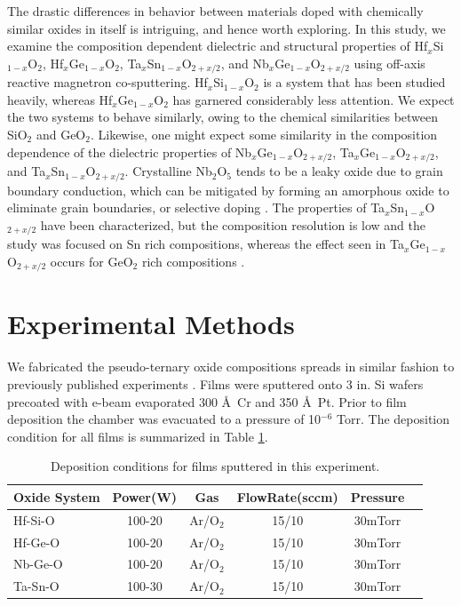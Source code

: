 The drastic differences in behavior between materials doped with chemically similar oxides in itself is intriguing, and hence worth exploring. In this study, we examine the composition dependent dielectric and structural properties of Hf$_{x}$Si$_{1-x}$O$_{2}$, Hf$_{x}$Ge$_{1-x}$O$_{2}$, Ta$_{x}$Sn$_{1-x}$O$_{2+x/2}$, and Nb$_{x}$Ge$_{1-x}$O$_{2+x/2}$ using off-axis reactive magnetron co-sputtering. Hf$_{x}$Si$_{1-x}$O$_{2}$ is a system that has been studied heavily, whereas Hf$_{x}$Ge$_{1-x}$O$_{2}$ has garnered considerably less attention. We expect the two systems to behave similarly, owing to the chemical similarities between SiO$_{2}$ and GeO$_{2}$. Likewise, one might expect some similarity in the composition dependence of the dielectric properties of Nb$_{x}$Ge$_{1-x}$O$_{2+x/2}$, Ta$_{x}$Ge$_{1-x}$O$_{2+x/2}$, and  Ta$_{x}$Sn$_{1-x}$O$_{2+x/2}$. Crystalline Nb$_{2}$O$_{5}$ tends to be a leaky oxide due to grain boundary conduction, which can be mitigated by forming an amorphous oxide to eliminate grain boundaries, or selective doping \cite{Pignolet1995,Kukli1999}. The properties of  Ta$_{x}$Sn$_{1-x}$O$_{2+x/2}$ have been characterized, but the composition resolution is low and the study was focused on Sn rich compositions, whereas the effect seen in Ta$_{x}$Ge$_{1-x}$O$_{2+x/2}$ occurs for GeO$_{2}$ rich compositions \cite{Fujikawa1997}.

\section{Experimental Methods}

We fabricated the pseudo-ternary oxide compositions spreads in similar fashion to previously published experiments \cite{VanDover1998}. Films were sputtered onto 3 in. Si wafers precoated with e-beam evaporated 300 \AA\ Cr and 350 \AA\ Pt. Prior to film deposition the chamber was evacuated to a pressure of 10$^{-6}$ Torr. The deposition condition for all films is summarized in Table \ref{tab:depcond}.

\begin{table}[h]
\centering
\caption{Deposition conditions for films sputtered in this experiment.}
\begin{tabular}{lccccc}
\hline\hline
Oxide System & Power(W) & Gas & FlowRate(sccm) & Pressure\\
\hline
Hf-Si-O & 100-20 & Ar/O$_{2}$ & 15/10 & 30mTorr\\
Hf-Ge-O & 100-20 & Ar/O$_{2}$ & 15/10 & 30mTorr\\
Nb-Ge-O & 100-20 & Ar/O$_{2}$ & 15/10 & 30mTorr\\
Ta-Sn-O & 100-30 & Ar/O$_{2}$ & 15/10 & 30mTorr\\ \hline
\end{tabular}
\label{tab:depcond}
\end{table}

